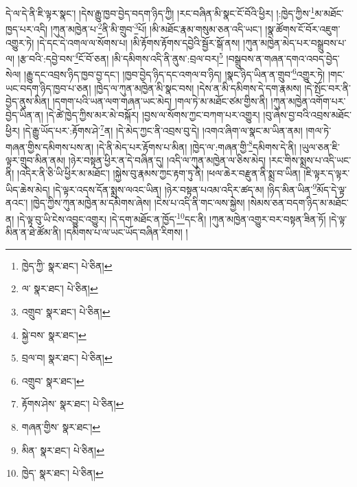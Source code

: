དེ་ལ་དེ་ནི་ཇི་ལྟར་སྣང་། །དེས་རྒྱུ་ཁྱབ་བྱེད་བདག་ཉིད་ཀྱི། །རང་བཞིན་མི་སྣང་ངོ་བོའི་ཕྱིར། །:ཁྱེད་ཀྱིས་\footnote{ཁྱེད་ཀྱི་  སྣར་ཐང་།  པེ་ཅིན། }མ་མཐོང་ཁྱད་པར་འདི། །ཀུན་མཁྱེན་པ་\footnote{ལ་  སྣར་ཐང་།  པེ་ཅིན། }ནི་མི་གྲུབ་\footnote{འགྲུབ་  སྣར་ཐང་།  པེ་ཅིན། }པོ། །མི་མཐོང་རྣམ་གསུམ་ཅན་འདི་ཡང་། །སྣ་ཚོགས་ངོ་བོར་འཇུག་འགྱུར་ཏེ། །དེ་དང་དེ་འགལ་ལ་སོགས་པ། །མི་རྟོགས་རྟོགས་དབྱེའི་སྦྱོར་སྒོ་ནས། །ཀུན་མཁྱེན་མེད་པར་བསྒྲུབས་པ་ལ། །རྩ་བའི་:དབྱེ་བས་\footnote{སྐྱེ་བས་  སྣར་ཐང་། }ངོ་བོ་ཅན། །མི་དམིགས་འདི་ནི་ནུས་:བྲལ་བར།\footnote{བྲལ་བ།  སྣར་ཐང་།  པེ་ཅིན། } །བསྒྲུབས་ན་གཞན་དགའ་འབད་བྱེད་སེལ། །རྒྱུ་དང་འབྲས་ཉིད་ཁྱབ་བྱ་དང་། །ཁྱབ་བྱེད་ཉིད་དང་འགལ་བ་ཉིད། །སྣང་ཉིད་ཡིན་ན་གྲུབ་\footnote{འགྲུབ་  སྣར་ཐང་། }འགྱུར་ཏེ། །གང་ཡང་བདག་ཉིད་ཁྱབ་པ་ཅན། །ཁྱེད་ལ་ཀུན་མཁྱེན་མི་སྣང་བས། །དེས་ན་མི་དམིགས་དེ་དག་རྣམས། །དེ་སྤོང་བར་ནི་བྱེད་ནུས་མིན། །དགག་པའི་ཡན་ལག་གཞན་ཡང་མེད། །གལ་ཏེ་མ་མཐོང་ཙམ་གྱིས་ནི། །ཀུན་མཁྱེན་འགོག་པར་བྱེད་ཡིན་ན། །དེ་ཚེ་ཁྱེད་ཀྱིས་མར་མེ་བསྐོར། །བྱས་ལ་སོགས་ཀྱང་བཀག་པར་འགྱུར། །བུ་ཞེས་བྱ་བའི་འབྲས་མཐོང་ཕྱིར། །དེ་རྒྱུ་ཡོད་པར་:རྟོགས་ཤེ་\footnote{རྟོགས་ཤེས་  སྣར་ཐང་།  པེ་ཅིན། }ན། །དེ་མེད་ཀྱང་ནི་འབྲས་བུ་དེ། །འགའ་ཞིག་ལ་སྣང་མ་ཡིན་ནམ། །གལ་ཏེ་གཞན་གྱིས་དམིགས་པས་ན། །དེ་ནི་མེད་པར་རྟོགས་པ་མིན། །ཁྱེད་ལ་:གཞན་གྱི་\footnote{གཞན་གྱིས་  སྣར་ཐང་། }དམིགས་དེ་ནི། །ཡུལ་ཅན་ཇི་ལྟར་གྲུབ་མིན་ནམ། །ཉེར་བསྟན་ཕྱིར་ན་དེ་བཞིན་དུ། །འདི་ལ་ཀུན་མཁྱེན་ལ་ཅིས་མེད། །རང་གིས་སྨྲས་པ་འདི་ཡང་ནི། །འདིར་ནི་ཅི་ཡི་ཕྱིར་མ་མཐོང་། །སྐྱེས་བུ་རྣམས་ཀྱང་རྟག་ཏུ་ནི། །ཕལ་ཆེར་བརྫུན་ནི་སྨྲ་བ་ཡིན། །ཇི་ལྟར་ད་ལྟར་ཡིད་ཆེས་མེད། །དེ་ལྟར་འདས་དོན་སྨྲས་ལའང་ཡིན། །ཉེར་བསྟན་པའམ་འདིར་ཚད་མ། །ཉིད་མིན་ཡིན་\footnote{མིན་  སྣར་ཐང་།  པེ་ཅིན། }མོད་དེ་ལྟ་ནའང་། །ཁྱེད་ཀྱིས་ཀུན་མཁྱེན་མ་དམིགས་ཞེས། །ངེས་པ་འདི་ནི་གང་ལས་སྐྱེས། །སེམས་ཅན་བདག་ཉིད་མ་མཐོང་ན། །དེ་ལྟ་བུ་ཡི་ངེས་འབྱུང་འགྱུར། །དེ་དག་མཐོང་ན་ཁྱོད་\footnote{ཁྱེད་  སྣར་ཐང་།  པེ་ཅིན། }དང་ནི། །ཀུན་མཁྱེན་འགྱུར་བར་བསྟན་ཟིན་ཏོ། །དེ་ལྟ་མིན་ན་ཐེ་ཚོམ་ནི། །དམིགས་པ་ལ་ཡང་ཡོད་བཞིན་རིགས། །
